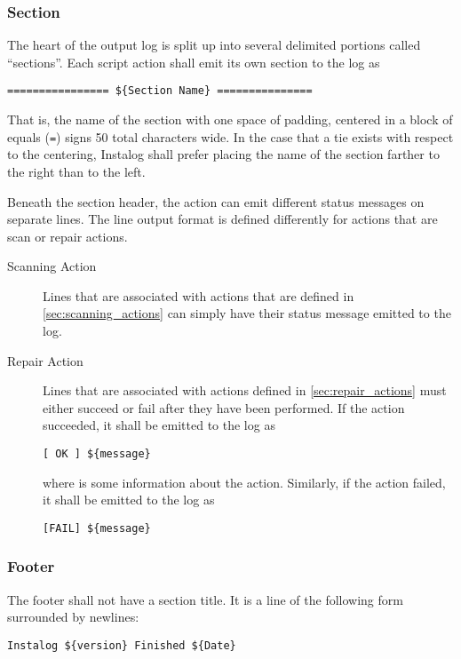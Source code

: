 \subsubsection{Section}
The heart of the output log is split up into several delimited portions called
``sections''.  Each script action shall emit its own section to the log as

\begin{verbatim}
================ ${Section Name} ===============
\end{verbatim}

That is, the name of the section with one space of padding, centered in a block
of equals (\verb|=|) signs 50 total characters wide. In the case that a tie
exists with respect to the centering, Instalog shall prefer placing the name of
the section farther to the right than to the left.

Beneath the section header, the action can emit different status messages on
separate lines.  The line output format is defined differently for actions that
are scan or repair actions.
\begin{description}
\item[Scanning Action]
Lines that are associated with actions that are defined in
\ref{sec:scanning_actions} can simply have their status message emitted to the log.
\item[Repair Action]
Lines that are associated with actions defined in \ref{sec:repair_actions} must
either succeed or fail after they have been performed.  If the action succeeded,
it shall be emitted to the log as
\vspace{-\baselineskip}
\begin{verbatim}
[ OK ] ${message}
\end{verbatim}
where  is some information about the action.  Similarly, if the
action failed, it shall be emitted to the log as
\vspace{-\baselineskip}
\begin{verbatim}
[FAIL] ${message}
\end{verbatim}
\end{description}

\subsubsection{Footer}
The footer shall not have a section title. It is a line of the following form
surrounded by newlines:
\begin{verbatim}
Instalog ${version} Finished ${Date}
\end{verbatim}


